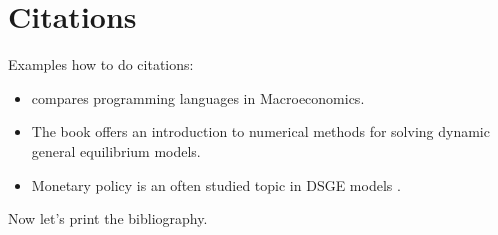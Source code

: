 \documentclass[a4paper]{scrartcl}
\begin{document}
\section{Citations}\label{sec:citations}
Examples how to do citations:
\begin{itemize}
  \item \textcite{Aruoba.Fernandez-Villaverde_2015_ComparisonProgrammingLanguages} compares programming languages in Macroeconomics.
  \item The book \textcite{Heer.Maussner_2024_DynamicGeneralEquilibrium} offers an introduction to numerical methods for solving dynamic general equilibrium models.
  \item Monetary policy is an often studied topic in DSGE models \parencite{Christiano.Trabandt.Walentin_2010_DSGEModelsMonetary}.
\end{itemize}
Now let's print the bibliography.
\newpage
\printbibliography%
\end{document}
